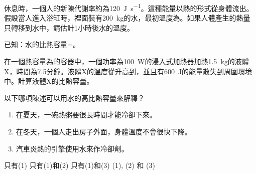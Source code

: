 {
    休息時，一個人的新陳代謝率約為\qty{120}{J.s^{-1}}。這種能量以熱的形式從身體流出。假設當人進入浴缸時，裡面裝有\qty{200}{kg}的水，最初溫度為。如果人體產生的熱量只轉移到水中，請估計1小時後水的溫度。
    \par 已知：水的比熱容量=。
    \begin{choices}
        \CorrectChoice {}
        \choice {}
        \choice {}
        \choice {}
    \end{choices}
}{}

{
    在一個熱容量為的容器中，一個功率為\qty{100}{W}的浸入式加熱器加熱\qty{1.5}{kg}的液體X，時間為7.5分鐘。液體X的溫度從升高到，並且有\qty{600}{J}的能量散失到周圍環境中。計算液體X的比熱容量。
    \begin{choices}
        \choice {}
        \choice {}
        \choice {}
        \CorrectChoice {}
    \end{choices}
}{}

{
    以下哪項陳述可以用水的高比熱容量來解釋？
    \begin{enumerate}[label=\sd]
        \item 在夏天，一碗熱粥要很長時間才能冷卻下來。
        \item 在冬天，一個人走出房子外面，身體溫度不會很快下降。
        \item 汽車炎熱的引擎使用水來作冷卻劑。
    \end{enumerate}
    \begin{choices}
        \choice 只有(1)
        \choice 只有(1)和(2)
        \choice 只有(1)和(3)
        \CorrectChoice (1), (2) 和 (3)
    \end{choices}
}{}

